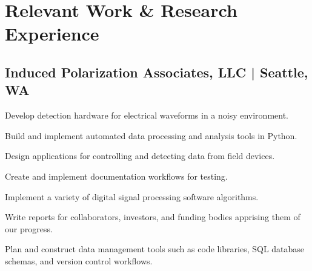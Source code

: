 \documentclass[letterpaper]{radler-resume-class}
\begin{document}
%
%
\vspace{0pt}
\begin{minipage}[t]{0.65\textwidth} %


\section{Relevant Work \& Research Experience}

\sectionspace

\subsection{Induced Polarization Associates, LLC | Seattle, WA}
\vspace{\topsep} %
\begin{tightitemize}
\item Develop detection hardware for  electrical waveforms in a noisy environment. 
\item Build and implement automated data processing and analysis tools in Python.
\item Design applications for controlling and detecting data from field devices.
\item Create and implement documentation workflows for testing.
\item Implement a variety of digital signal processing software algorithms. 
\item Write reports for collaborators, investors, and funding bodies apprising them of our progress.
\item Plan and construct data management tools such as code libraries, SQL database schemas, and version control workflows. 
\end{tightitemize}
\sectionspace 


\end{minipage}
\end{document}
